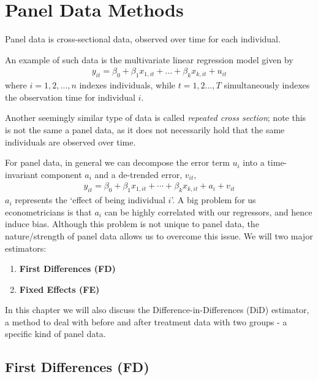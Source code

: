 \chapter{Panel Data Methods}
	\begin{definition}
		Panel data is cross-sectional data, observed over time for each individual.
	\end{definition}
	An example of such data is the multivariate linear regression model given by
	\begin{align}
		y_{it} = \beta_0 +\beta_1 x_{1,it}+\dots +\beta_k x_{k,it}+u_{it}
	\end{align}
	where $i=1,2,\dots,n$ indexes individuals, while $t=1,2\dots,T$ simultaneously indexes the observation time for individual $i$.
	
	Another seemingly similar type of data is called \textit{repeated cross section}; note this is not the same a panel data, as it does not necessarily hold that the same individuals are observed over time.
	
	For panel data, in general we can decompose the error term $u_i$ into a time-invariant component $a_i$ and a de-trended error, $v_{it}$,
	\begin{align}
		y_{it} = \beta_0 +\beta_1 x_{1,it}+ \cdots +\beta_k x_{k,it} +a_i +v_{it}
	\end{align}
	$a_i$ represents the `effect of being individual $i$'. A big problem for us econometricians is that $a_i$ can be highly correlated with our regressors, and hence induce bias. Although this problem is not unique to panel data, the nature/strength of panel data allows us to overcome this issue. We will two major estimators:
	\begin{enumerate}
		\item \textbf{First Differences (FD)}
		\item \textbf{Fixed Effects (FE)}
	\end{enumerate}
	In this chapter we will also discuss the Difference-in-Differences (DiD) estimator, a method to deal with before and after treatment data with two groups - a specific kind of panel data.
	
    \section{First Differences (FD)}
